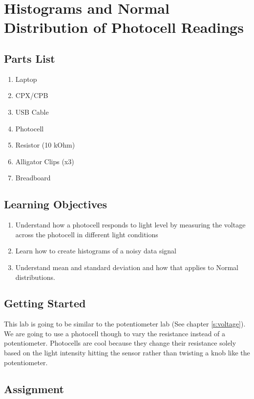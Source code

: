 \newpage

\section{Histograms and Normal Distribution of Photocell Readings}
\label{s:photocell}

\subsection{Parts List}

\begin{enumerate}[itemsep=-5pt]
\item Laptop
\item CPX/CPB
\item USB Cable
\item Photocell
\item Resistor (10 kOhm)
\item Alligator Clips (x3)
\item Breadboard
\end{enumerate}

\subsection{Learning Objectives}
\begin{enumerate}[itemsep=-5pt]
\item Understand how a photocell responds to light level by measuring the voltage across the photocell in different light conditions
\item Learn how to create histograms of a noisy data signal
\item Understand mean and standard deviation and how that applies to Normal distributions.
\end{enumerate}

\subsection{Getting Started}

This lab is going to be similar to the potentiometer lab (See chapter \ref{s:voltage}). We are going to use a photocell though to vary the resistance instead of a potentiometer. Photocells are cool because they change their resistance solely based on the light intensity hitting the sensor rather than twisting a knob like the potentiometer.

\subsection{Assignment}

